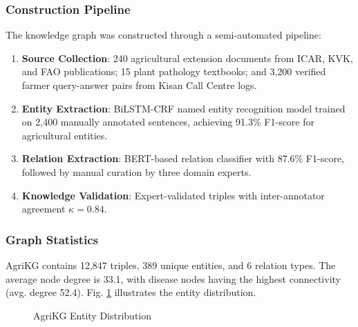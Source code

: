 \documentclass[conference]{IEEEtran}
\begin{document}
\subsubsection{Construction Pipeline}

The knowledge graph was constructed through a semi-automated pipeline:

\begin{enumerate}
    \item \textbf{Source Collection}: 240 agricultural extension documents from ICAR, KVK, and FAO publications; 15 plant pathology textbooks; and 3,200 verified farmer query-answer pairs from Kisan Call Centre logs.

    \item \textbf{Entity Extraction}: BiLSTM-CRF named entity recognition model trained on 2,400 manually annotated sentences, achieving 91.3\% F1-score for agricultural entities.

    \item \textbf{Relation Extraction}: BERT-based relation classifier with 87.6\% F1-score, followed by manual curation by three domain experts.

    \item \textbf{Knowledge Validation}: Expert-validated triples with inter-annotator agreement $\kappa = 0.84$.
\end{enumerate}

\subsubsection{Graph Statistics}

AgriKG contains 12,847 triples, 389 unique entities, and 6 relation types. The average node degree is 33.1, with disease nodes having the highest connectivity (avg. degree 52.4). Fig. \ref{fig:kg_stats} illustrates the entity distribution.

\begin{figure}[htbp]
\centering
{}
\caption{AgriKG Entity Distribution}
\label{fig:kg_stats}
\end{figure}
\end{document}
